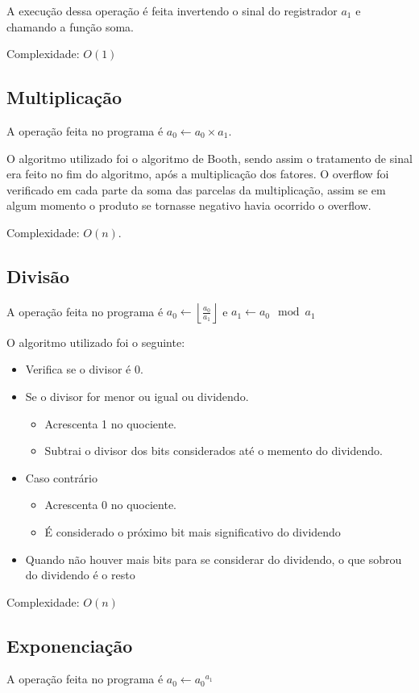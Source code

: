 \documentclass[12pt, letterpaper]{article}
\begin{document}
		A execução dessa operação é feita invertendo o sinal do registrador $a_1$ e chamando a função soma.

		Complexidade: $O(1)$
	\subsection{Multiplicação}
		A operação feita no programa é $a_0 \leftarrow a_0 \times a_1$.

		O algoritmo utilizado foi o algoritmo de Booth, sendo assim o tratamento de sinal era feito no fim do algoritmo, após a multiplicação dos fatores. O overflow foi verificado em cada parte da soma das parcelas da multiplicação, assim se em algum momento o produto se tornasse negativo havia ocorrido o overflow.

		Complexidade: $O(n)$.
	\subsection{Divisão}
		A operação feita no programa é $a_0 \leftarrow \left\lfloor \frac{a_0}{a_1} \right\rfloor$ e $a_1 \leftarrow a_0 \mod a_1$ 

		O algoritmo utilizado foi o seguinte:
		\begin{itemize}
			\item{Verifica se o divisor é 0.}
			\item{Se o divisor for menor ou igual ou dividendo.}
			\begin{itemize}
				\item{Acrescenta 1 no quociente.}
				\item{Subtrai o divisor dos bits considerados até o memento do dividendo.}
			\end{itemize}
			\item{Caso contrário}
			\begin{itemize}
				\item{Acrescenta 0 no quociente.}
				\item{É considerado o próximo bit mais significativo do dividendo}
			\end{itemize}
			\item{Quando não houver mais bits para se considerar do dividendo, o que sobrou do dividendo é o resto}
		\end{itemize}

		Complexidade: $O(n)$
	\subsection{Exponenciação}
		A operação feita no programa é $a_0 \leftarrow {a_0}^{a_1}$
\end{document}
